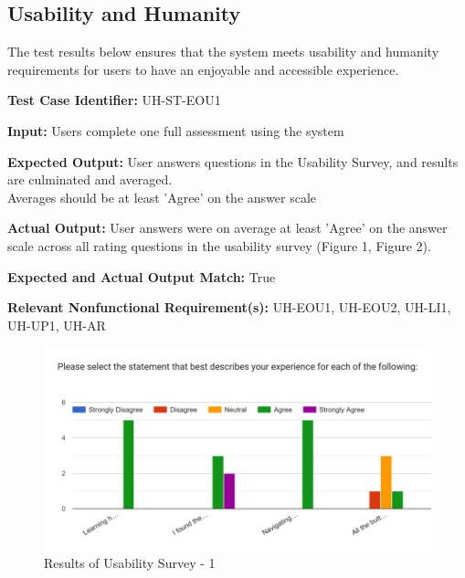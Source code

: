 \documentclass[12pt, titlepage]{article}
\begin{document}
\subsection{Usability and Humanity}
\hspace{2em}The test results below ensures that the system meets usability and humanity
requirements for users to have an enjoyable and accessible experience.

\begin{mdframed}[linewidth=0.5mm] \par
  \textbf{Test Case Identifier:} UH-ST-EOU1 \par
  \textbf{Input:} Users complete one full assessment using the system \par
  \textbf{Expected Output:} User answers questions in the Usability Survey, and results are culminated and averaged.\\
  Averages should be at least 'Agree' on the answer scale \par
  \textbf{Actual Output:} User answers were on average at least 'Agree' on the answer scale across all rating questions in the usability survey (Figure 1, Figure 2).\par
  \textbf{Expected and Actual Output Match:} True \par
  \textbf{Relevant Nonfunctional Requirement(s):} UH-EOU1, UH-EOU2, UH-LI1, UH-UP1, UH-AR
\end{mdframed}

\begin{figure}[h]
  \centering
  \includegraphics[width=1\textwidth]{images/UsabilityTestResults_pt1.png}
  \caption{Results of Usability Survey - 1}
\end{figure}
\end{document}
